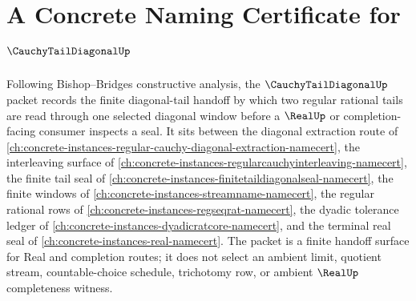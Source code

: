 \chapter{A Concrete Naming Certificate for $\CauchyTailDiagonalUp$}
\label{ch:concrete-instances-cauchy-tail-diagonal-namecert}

Following Bishop--Bridges constructive analysis, the $\CauchyTailDiagonalUp$ packet records the finite diagonal-tail handoff by which two regular rational tails are read through one selected diagonal window before a $\RealUp$ or completion-facing consumer inspects a seal. It sits between the diagonal extraction route of \autoref{ch:concrete-instances-regular-cauchy-diagonal-extraction-namecert}, the interleaving surface of \autoref{ch:concrete-instances-regularcauchyinterleaving-namecert}, the finite tail seal of \autoref{ch:concrete-instances-finitetaildiagonalseal-namecert}, the finite windows of \autoref{ch:concrete-instances-streamname-namecert}, the regular rational rows of \autoref{ch:concrete-instances-regseqrat-namecert}, the dyadic tolerance ledger of \autoref{ch:concrete-instances-dyadicratcore-namecert}, and the terminal real seal of \autoref{ch:concrete-instances-real-namecert}. The packet is a finite handoff surface for Real and completion routes; it does not select an ambient limit, quotient stream, countable-choice schedule, trichotomy row, or ambient $\RealUp$ completeness witness.

